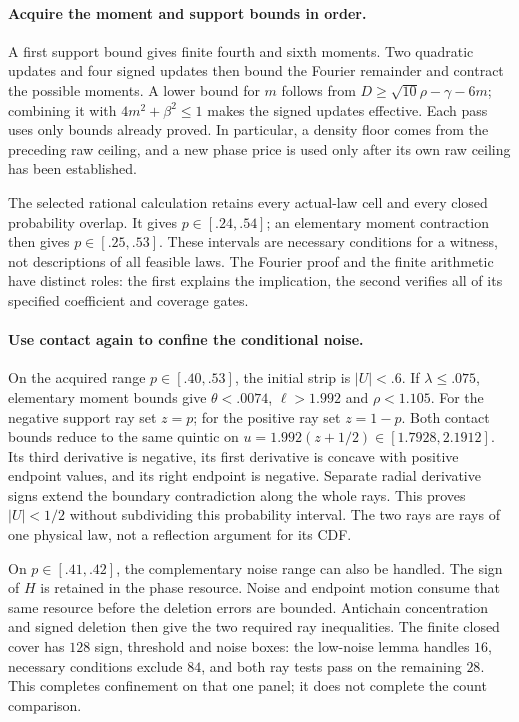 \paragraph{Acquire the moment and support bounds in order.}
A first support bound gives finite fourth and sixth moments. Two quadratic
updates and four signed updates then bound the Fourier remainder and
contract the possible moments. A lower bound for $m$ follows from
$D\ge\sqrt{10}\rho-\gamma-6m$; combining it with
$4m^2+\beta^2\le1$ makes the signed updates effective. Each pass uses only
bounds already proved. In particular, a density floor comes from the
preceding raw ceiling, and a new phase price is used only after its own
raw ceiling has been established.

The selected rational calculation retains every actual-law cell and
every closed probability overlap. It gives $p\in[.24,.54]$; an elementary
moment contraction then gives $p\in[.25,.53]$. These intervals are
necessary conditions for a witness, not descriptions of all feasible
laws. The Fourier proof and the finite arithmetic have distinct roles:
the first explains the implication, the second verifies all of its
specified coefficient and coverage gates.

\paragraph{Use contact again to confine the conditional noise.}
On the acquired range $p\in[.40,.53]$, the initial strip is $|U|<.6$.
If $\lambda\le.075$, elementary moment bounds give
$\theta<.0074$, $\ell>1.992$ and $\rho<1.105$.
For the negative support ray set $z=p$; for the positive ray set $z=1-p$.
Both contact bounds reduce to the same quintic on
$u=1.992(z+1/2)\in[1.7928,2.1912]$.
Its third derivative is negative, its first derivative is concave with
positive endpoint values, and its right endpoint is negative. Separate
radial derivative signs extend the boundary contradiction along the
whole rays. This proves $|U|<1/2$ without subdividing this probability
interval. The two rays are rays of one physical law, not a reflection
argument for its CDF.

On $p\in[.41,.42]$, the complementary noise range can also be handled.
The sign of $H$ is retained in the phase resource. Noise and endpoint
motion consume that same resource before the deletion errors are bounded.
Antichain concentration and signed deletion then give the two required
ray inequalities. The finite closed cover has $128$ sign, threshold and
noise boxes: the low-noise lemma handles $16$, necessary conditions
exclude $84$, and both ray tests pass on the remaining $28$.
This completes confinement on that one panel; it does not complete the
count comparison.

